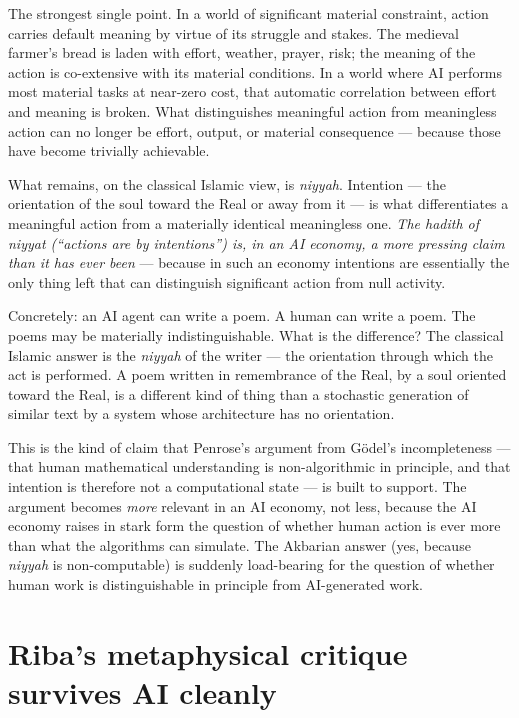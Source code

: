 \documentclass[11pt,a4paper]{article}
\newcommand{\arb}[1]{\textit{#1}}
\begin{document}
The strongest single point. In a world of significant material
constraint, action carries default meaning by virtue of its
struggle and stakes. The medieval farmer's bread is laden with
effort, weather, prayer, risk; the meaning of the action is
co-extensive with its material conditions. In a world where AI
performs most material tasks at near-zero cost, that automatic
correlation between effort and meaning is broken. What
distinguishes meaningful action from meaningless action can no
longer be effort, output, or material consequence --- because
those have become trivially achievable.

What remains, on the classical Islamic view, is \arb{niyyah}.
Intention --- the orientation of the soul toward the Real or away
from it --- is what differentiates a meaningful action from a
materially identical meaningless one. \textit{The hadith of
\arb{niyyat} (``actions are by intentions'') is, in an AI economy,
a more pressing claim than it has ever been} --- because in such
an economy intentions are essentially the only thing left that can
distinguish significant action from null activity.

Concretely: an AI agent can write a poem. A human can write a
poem. The poems may be materially indistinguishable. What is the
difference? The classical Islamic answer is the \arb{niyyah} of
the writer --- the orientation through which the act is performed.
A poem written in remembrance of the Real, by a soul oriented
toward the Real, is a different kind of thing than a stochastic
generation of similar text by a system whose architecture has no
orientation.

This is the kind of claim that Penrose's argument from G\"odel's
incompleteness --- that human mathematical understanding is
non-algorithmic in principle, and that intention is therefore not
a computational state --- is built to support. The argument
becomes \textit{more} relevant in an AI economy, not less, because
the AI economy raises in stark form the question of whether human
action is ever more than what the algorithms can simulate. The
Akbarian answer (yes, because \arb{niyyah} is non-computable) is
suddenly load-bearing for the question of whether human work is
distinguishable in principle from AI-generated work.

\section{Riba's metaphysical critique survives AI cleanly}
\label{sec:riba-survives}
\end{document}
